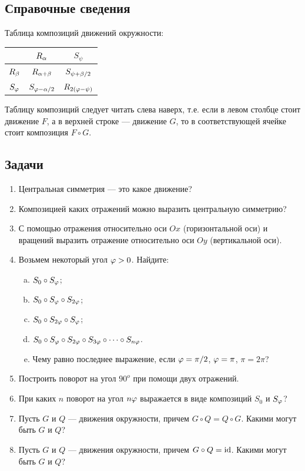 \subsection*{Справочные сведения}

Таблица композиций движений окружности:
\begin{center}
\begin{tabular}{c|c|c|}
  & $R_\alpha$ & $S_\psi$ \\
 \hline
$R_\beta$ & $R_{\alpha+\beta}$ & $S_{\psi+\beta/2}$ \\
 \hline
$S_\varphi$ & $S_{\varphi-\alpha/2}$ & $R_{2(\varphi-\psi)}$ \\
\hline
\end{tabular}
\end{center}

Таблицу композиций следует читать слева наверх, т.е. если в левом столбце стоит движение $F$, а в верхней строке --- движение $G$, то в соответствующей ячейке стоит композиция $F\circ G$.

\subsection*{Задачи}
\begin{enumerate}
\item Центральная симметрия --- это какое движение?
\item Композицией каких отражений можно выразить центральную симметрию?
\item С помощью отражения относительно оси $Ox$ (горизонтальной оси) и вращений выразить отражение относительно оси $Oy$ (вертикальной оси).
\item Возьмем некоторый угол $\varphi>0$. Найдите:
\begin{enumerate}[a)]
\item $S_0\circ S_\varphi$;
\item $S_0\circ S_\varphi\circ S_{2\varphi}$;
\item $S_0\circ S_{2\varphi}\circ S_{\varphi}$;
\item $\displaystyle S_0\circ S_\varphi\circ S_{2\varphi}\circ S_{3\varphi}\circ\dots\circ S_{n\varphi}$.
\item Чему равно последнее выражение, если $\varphi=\pi/2$, $\varphi=\pi$, $\pi=2\pi$?
\end{enumerate}
\item Построить поворот на угол $90^o$ при помощи двух отражений.
\item При каких $n$ поворот на угол $n\varphi$ выражается в виде композиций $S_0$ и $S_\varphi$?
\item Пусть $G$ и $Q$ --- движения окружности, причем $G\circ Q=Q\circ G$. Какими могут быть $G$ и $Q$?
\item Пусть $G$ и $Q$ --- движения окружности, причем $G\circ Q=\mathrm{id}$. Какими могут быть $G$ и $Q$?
\end{enumerate}







